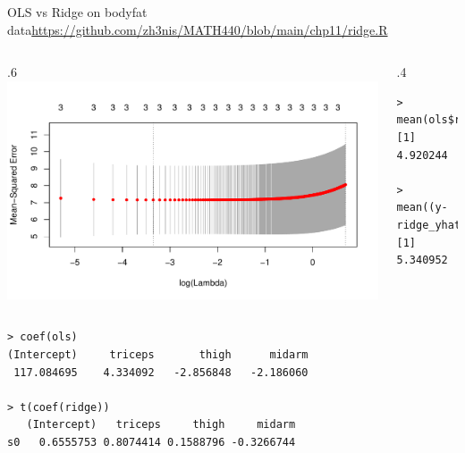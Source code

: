 \documentclass{beamer}
\begin{document}
\begin{frame}[fragile]{OLS vs Ridge on bodyfat data}{\url{https://github.com/zh3nis/MATH440/blob/main/chp11/ridge.R}}
\begin{columns}
\begin{column}{.6\textwidth}
\includegraphics[height=.4\textheight]{plots/ridge_lambda.pdf}
\end{column}
\begin{column}{.4\textwidth}
\begin{footnotesize}
\begin{verbatim}
> mean(ols$residuals^2)
[1] 4.920244

> mean((y-ridge_yhat)^2)
[1] 5.340952
\end{verbatim}
\end{footnotesize}
\end{column}
\end{columns}
\begin{footnotesize}
\begin{verbatim}
> coef(ols)
(Intercept)     triceps       thigh      midarm 
 117.084695    4.334092   -2.856848   -2.186060 

> t(coef(ridge))
   (Intercept)   triceps     thigh     midarm
s0   0.6555753 0.8074414 0.1588796 -0.3266744
\end{verbatim}
\end{footnotesize}
\end{frame}
\end{document}
